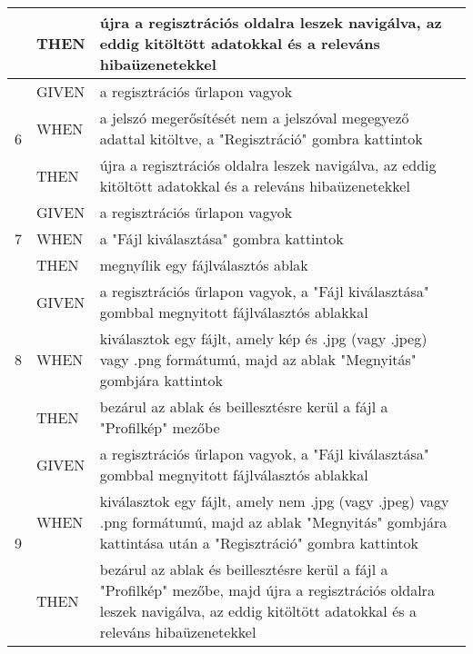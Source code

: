 \begin{center}
\begin{longtable}{ | m{}| m{} | m{} | }
		\cline{2-3} 
		& THEN & újra a regisztrációs oldalra leszek navigálva, az eddig kitöltött adatokkal és a releváns hibaüzenetekkel \\
		\hline
		\multirow{3}{*}{6} & GIVEN & a regisztrációs űrlapon vagyok \\
		\cline{2-3}
		& WHEN & a jelszó megerősítését nem a jelszóval megegyező adattal kitöltve, a "Regisztráció" gombra kattintok \\
		\cline{2-3} 
		& THEN & újra a regisztrációs oldalra leszek navigálva, az eddig kitöltött adatokkal és a releváns hibaüzenetekkel \\
		\hline
		\multirow{3}{*}{7} & GIVEN & a regisztrációs űrlapon vagyok \\
		\cline{2-3}
		& WHEN & a "Fájl kiválasztása" gombra kattintok \\
		\cline{2-3} 
		& THEN & megnyílik egy fájlválasztós ablak \\
		\hline
		\multirow{3}{*}{8} & GIVEN & a regisztrációs űrlapon vagyok, a "Fájl kiválasztása" gombbal megnyitott fájlválasztós ablakkal\\
		\cline{2-3}
		& WHEN & kiválasztok egy fájlt, amely kép és .jpg (vagy .jpeg) vagy .png formátumú, majd az ablak "Megnyitás" gombjára kattintok \\
		\cline{2-3} 
		& THEN & bezárul az ablak és beillesztésre kerül a fájl a "Profilkép" mezőbe \\
		\hline
		\multirow{3}{*}{9} & GIVEN & a regisztrációs űrlapon vagyok, a "Fájl kiválasztása" gombbal megnyitott fájlválasztós ablakkal\\
		\cline{2-3}
		& WHEN & kiválasztok egy fájlt, amely nem .jpg (vagy .jpeg) vagy .png formátumú, majd az ablak "Megnyitás" gombjára kattintása után a "Regisztráció" gombra kattintok \\
		\cline{2-3} 
		& THEN & bezárul az ablak és beillesztésre kerül a fájl a "Profilkép" mezőbe, majd újra a regisztrációs oldalra leszek navigálva, az eddig kitöltött adatokkal és a releváns hibaüzenetekkel \\
		\hline
	\end{longtable}
	\label{tab:sim_register}
\end{center}

